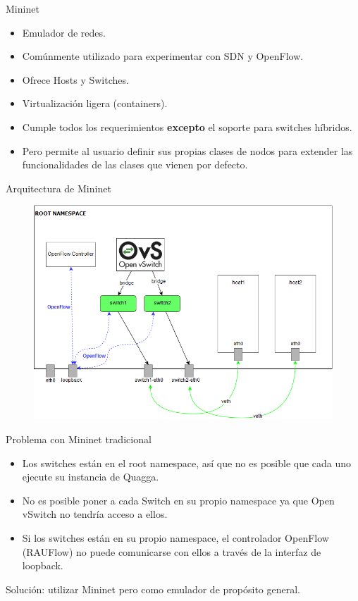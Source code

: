 \documentclass[xcolor=svgnames]{beamer}
\begin{document}
\begin{frame}{Mininet}
	\begin{itemize}
		\item Emulador de redes.
		\item Comúnmente utilizado para experimentar con SDN y OpenFlow.
		\item Ofrece Hosts y Switches.
		\item Virtualización ligera (containers).
		\item Cumple todos los requerimientos \textbf{excepto} el soporte para switches híbridos.
		\item Pero permite al usuario definir sus propias clases de nodos para extender las funcionalidades de las clases que vienen por defecto.
	\end{itemize}
\end{frame}

\begin{frame}{Arquitectura de Mininet}
	\begin{figure}[t]
		\centering
		\includegraphics[scale=0.5]{mininet_architecture}
	\end{figure}
\end{frame}

\begin{frame}{Problema con Mininet tradicional}
	\begin{itemize}
		\item Los switches están en el root namespace, así que no es posible que cada uno ejecute su instancia de Quagga.
		\item No es posible poner a cada Switch en su propio namespace ya que Open vSwitch no tendría acceso a ellos.
		\item Si los switches están en su propio namespace, el controlador OpenFlow (RAUFlow) no puede comunicarse con ellos a través de la interfaz de loopback.
	\end{itemize}
	\pause
	{\color{green}Solución: utilizar Mininet pero como emulador de propósito general.}
\end{frame}
\end{document}
